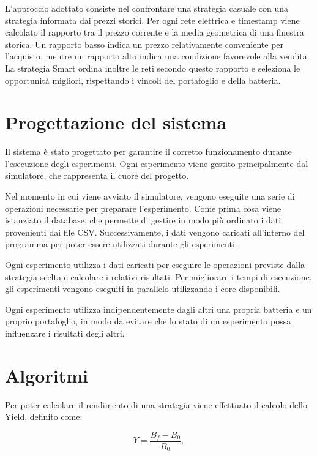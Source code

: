 \documentclass[12pt,a4paper,oneside]{report}
\begin{document}
L'approccio adottato consiste nel confrontare una strategia casuale con una
strategia informata dai prezzi storici. Per ogni rete elettrica e timestamp
viene calcolato il rapporto tra il prezzo corrente e la media geometrica di una
finestra storica. Un rapporto basso indica un prezzo relativamente conveniente
per l'acquisto, mentre un rapporto alto indica una condizione favorevole alla
vendita. La strategia Smart ordina inoltre le reti secondo questo rapporto e
seleziona le opportunità migliori, rispettando i vincoli del portafoglio e
della batteria.



\section{Progettazione del sistema}

Il sistema è stato progettato per garantire il corretto funzionamento durante
l'esecuzione degli esperimenti. Ogni esperimento viene gestito principalmente
dal simulatore, che rappresenta il cuore del progetto.

Nel momento in cui viene avviato il simulatore, vengono eseguite una serie di
operazioni necessarie per preparare l'esperimento. Come prima cosa viene
istanziato il database, che permette di gestire in modo più ordinato i dati
provenienti dai file CSV. Successivamente, i dati vengono caricati all'interno
del programma per poter essere utilizzati durante gli esperimenti.

Ogni esperimento utilizza i dati caricati per eseguire le operazioni previste
dalla strategia scelta e calcolare i relativi risultati. Per migliorare i tempi
di esecuzione, gli esperimenti vengono eseguiti in parallelo utilizzando i
core disponibili.

Ogni esperimento utilizza indipendentemente dagli altri una propria batteria
e un proprio portafoglio, in modo da evitare che lo stato di un esperimento
possa influenzare i risultati degli altri.


\section{Algoritmi}

Per poter calcolare il rendimento di una strategia viene effettuato il calcolo
dello Yield, definito come:

\begin{equation}
    Y = \frac{B_f - B_0}{B_0},
\end{equation}
\end{document}
